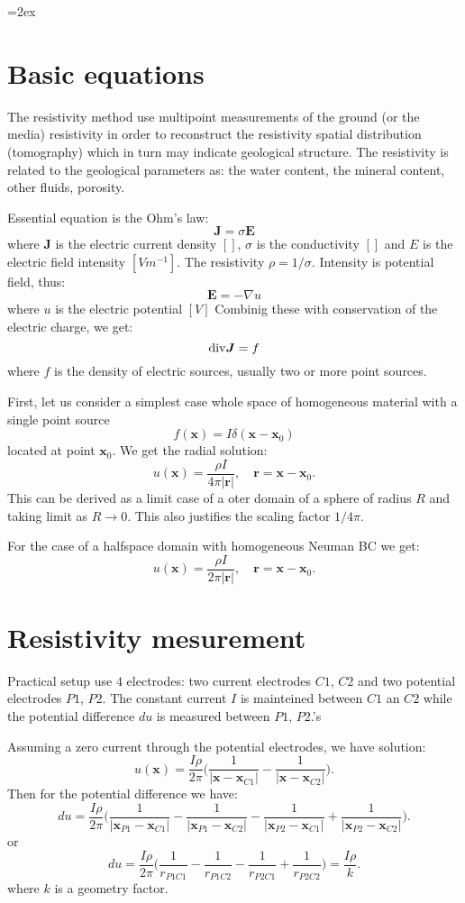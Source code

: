 \documentclass[a4paper, 12pt]{book}
\theoremstyle{definition}
\def\div{{\rm div}}
\def\grad{\nabla}
\def\to{\rightarrow}
\def\vc#1{\mathbf{\boldsymbol{#1}}}     %
\begin{document}
\parskip=2ex
\parindent=0pt

\section{Basic equations}
The resistivity method use multipoint measurements of the ground (or the media) resistivity in order to reconstruct 
the resistivity spatial distribution (tomography) which in turn may indicate geological structure. The resistivity is related to
the geological parameters as: the water content, the mineral content, other fluids, porosity.

Essential equation is the Ohm's law:
\[
    \vc J = \sigma \vc E
\]
where $\vc J$ is the electric current density $[]$, $\sigma$ is the conductivity $[]$ and $E$ is the electric field intensity $[Vm^{-1}]$.
The resistivity $\rho=1/\sigma$. Intensity is potential field, thus:
\[
    \vc E = -\grad u
\]
where $u$ is the electric potential $[V]$
Combinig these with conservation of the electric charge, we get:
\[
    \div \vc J = f
\]
where $f$ is the density of electric sources, usually two or more point sources.


First, let us consider a simplest case whole space of homogeneous material with a single point source
\[
    f(\vc x)=I\delta(\vc x - \vc x_0)
\]
located at point $\vc x_0$. We get the radial solution:
\[
    u(\vc x) = \frac{\rho I}{4\pi |\vc r|}, \quad \vc r = \vc x - \vc x_0.
\]
This can be derived as a limit case of a oter domain of a sphere of radius $R$ and 
taking limit as $R\to 0$. This also justifies the scaling factor $1/4\pi$. 

For the case of a halfspace domain with homogeneous Neuman BC we get:
\[
    u(\vc x) = \frac{\rho I}{2\pi |\vc r|}, \quad \vc r = \vc x - \vc x_0.
\]


\section{Resistivity mesurement}
Practical setup use $4$ electrodes: two current electrodes $C1$, $C2$  and two potential electrodes $P1$, $P2$.
The constant current $I$ is mainteined between $C1$ an $C2$ while the potential difference $du$ is measured between $P1$, $P2$.'s


Assuming a zero current through the potential electrodes, we have solution:
\[
    u(\vc x) = \frac{I\rho}{2\pi} \Big( \frac{1}{|\vc x - \vc x_{C1}|} - \frac{1}{|\vc x - \vc x_{C2}|}\Big).
\]
Then for the potential difference we have:
\[
    du = \frac{I\rho}{2\pi} \Big( \frac{1}{|\vc x_{P1} - \vc x_{C1}|} - \frac{1}{|\vc x_{P1} - \vc x_{C2}|}
    -\frac{1}{|\vc x_{P2} - \vc x_{C1}|} + \frac{1}{|\vc x_{P2} - \vc x_{C2}|} \Big).
\]
or
\[
    du = \frac{I\rho}{2\pi} \Big( \frac{1}{r_{P1C1}} - \frac{1}{r_{P1C2}} - \frac{1}{r_{P2C1}} + \frac{1}{r_{P2C2}} \Big) = \frac{I\rho}{k}.
\]
where $k$ is a geometry factor.
\end{document}
